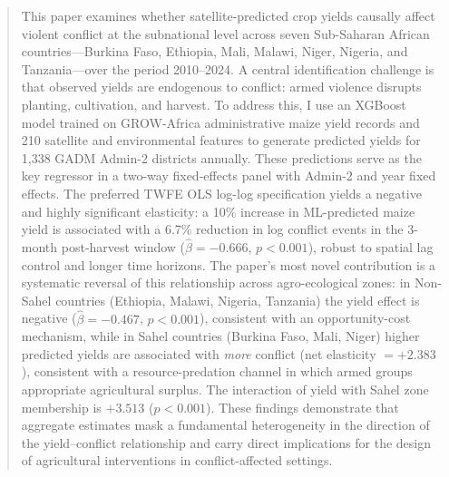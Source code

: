 \begin{abstract}
\noindent This paper examines whether satellite-predicted crop yields causally affect violent conflict at the subnational level across seven Sub-Saharan African countries---Burkina Faso, Ethiopia, Mali, Malawi, Niger, Nigeria, and Tanzania---over the period 2010--2024. A central identification challenge is that observed yields are endogenous to conflict: armed violence disrupts planting, cultivation, and harvest. To address this, I use an XGBoost model trained on GROW-Africa administrative maize yield records and 210 satellite and environmental features to generate predicted yields for 1,338 GADM Admin-2 districts annually. These predictions serve as the key regressor in a two-way fixed-effects panel with Admin-2 and year fixed effects. The preferred TWFE OLS log-log specification yields a negative and highly significant elasticity: a 10\% increase in ML-predicted maize yield is associated with a 6.7\% reduction in log conflict events in the 3-month post-harvest window ($\hat{\beta} = -0.666$, $p < 0.001$), robust to spatial lag control and longer time horizons. The paper's most novel contribution is a systematic reversal of this relationship across agro-ecological zones: in Non-Sahel countries (Ethiopia, Malawi, Nigeria, Tanzania) the yield effect is negative ($\hat{\beta} = -0.467$, $p < 0.001$), consistent with an opportunity-cost mechanism, while in Sahel countries (Burkina Faso, Mali, Niger) higher predicted yields are associated with \textit{more} conflict (net elasticity $= +2.383$), consistent with a resource-predation channel in which armed groups appropriate agricultural surplus. The interaction of yield with Sahel zone membership is $+3.513$ ($p < 0.001$). These findings demonstrate that aggregate estimates mask a fundamental heterogeneity in the direction of the yield--conflict relationship and carry direct implications for the design of agricultural interventions in conflict-affected settings.
\end{abstract}
